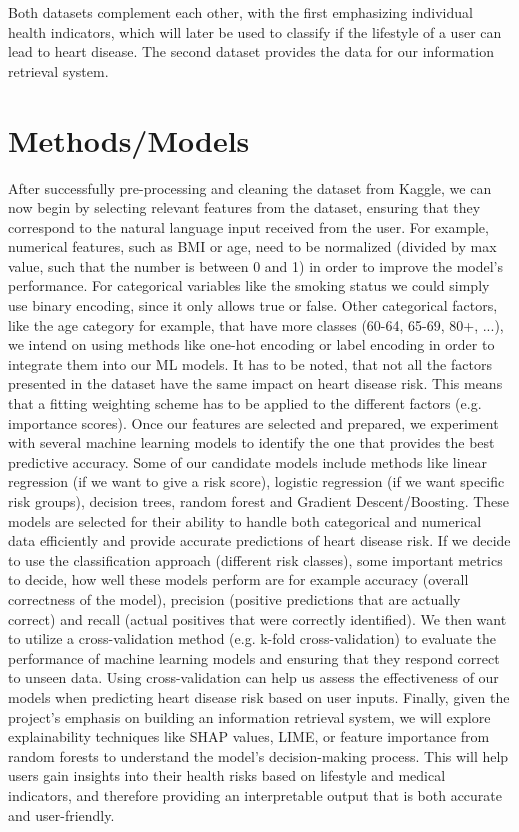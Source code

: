 \documentclass{article}
\begin{document}
Both datasets complement each other, with the first emphasizing individual health indicators, which will later be used to classify 
if the lifestyle of a user can lead to heart disease. The second dataset provides the data for our information retrieval system.

\section{Methods/Models}
After successfully pre-processing and cleaning the dataset from Kaggle, we can now begin by selecting relevant features from the dataset, ensuring that they correspond to the natural language input received from the user. For example, numerical features, such as BMI or age, need to be normalized (divided by max value, such that the number is between 0 and 1) in order to improve the model’s performance. For categorical variables like the smoking status we could simply use binary encoding, since it only allows true or false. Other categorical factors, like the age category for example, that have more classes (60-64, 65-69, 80+, ...), we intend on using methods like one-hot encoding or label encoding in order to integrate them into our ML models. It has to be noted, that not all the factors presented in the dataset have the same impact on heart disease risk. This means that a fitting weighting scheme has to be applied to the different factors (e.g. importance scores). Once our features are selected and prepared, we experiment with several machine learning models to identify the one that provides the best predictive accuracy. Some of our candidate models include methods like linear regression (if we want to give a risk score), logistic regression (if we want specific risk groups), decision trees, random forest and Gradient Descent/Boosting. These models are selected for their ability to handle both categorical and numerical data efficiently and provide accurate predictions of heart disease risk. If we decide to use the classification approach (different risk classes), some important metrics to decide, how well these models perform are for example accuracy (overall correctness of the model), precision (positive predictions that are actually correct) and recall (actual positives that were correctly identified). We then want to utilize a cross-validation method (e.g. k-fold cross-validation) to evaluate the performance of machine learning models and ensuring that they respond correct to unseen data. Using cross-validation can help us assess the effectiveness of our models when predicting heart disease risk based on user inputs. Finally, given the project’s emphasis on building an information retrieval system, we will explore explainability techniques like SHAP values, LIME, or feature importance from random forests to understand the model’s decision-making process. This will help users gain insights into their health risks based on lifestyle and medical indicators, and therefore providing an interpretable output that is both accurate and user-friendly.
\end{document}
